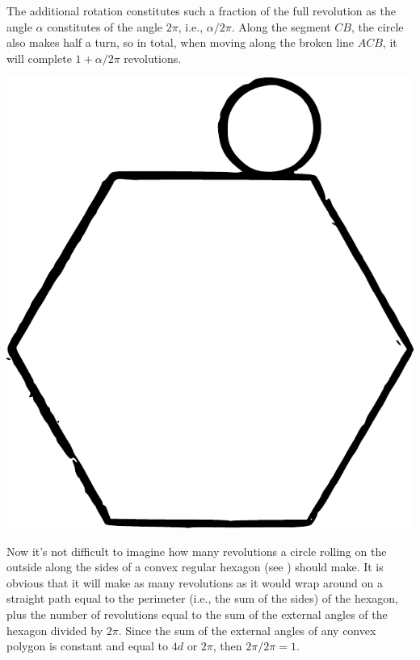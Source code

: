 The additional rotation constitutes such a fraction of the full revolution as the angle $ \alpha $ constitutes of the angle $ 2\pi $, i.e., $ \alpha/2\pi $. Along the segment $ CB $, the circle also makes half a turn, so in total, when moving along the broken line $ ACB $, it will complete $ 1 + \alpha/2\pi $ revolutions.

\begin{marginfigure}[-1cm]%
\centering
\includegraphics[width=\textwidth]{figures/ch-09/fig-129.pdf}
\end{marginfigure}

Now it's not difficult to imagine how many revolutions a circle rolling on the outside along the sides of a convex regular hexagon (see ) should make. It is obvious that it will make as many revolutions as it would wrap around on a straight path equal to the perimeter (i.e., the sum of the sides) of the hexagon, plus the number of revolutions equal to the sum of the external angles of the hexagon divided by $ 2\pi $. Since the sum of the external angles of any convex polygon is constant and equal to $ 4d $ or $ 2\pi $, then $ 2\pi / 2\pi = 1 $.

